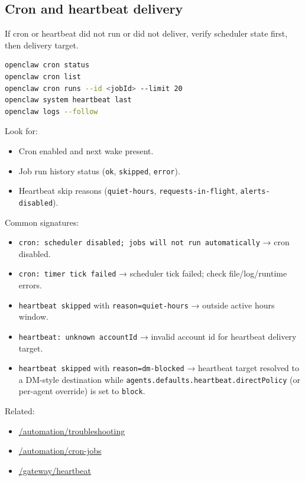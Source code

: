 \subsection{Cron and heartbeat delivery}


If cron or heartbeat did not run or did not deliver, verify scheduler state first, then delivery target.

\begin{lstlisting}[language=bash]
openclaw cron status
openclaw cron list
openclaw cron runs --id <jobId> --limit 20
openclaw system heartbeat last
openclaw logs --follow
\end{lstlisting}


Look for:

\begin{itemize}
  \item Cron enabled and next wake present.
  \item Job run history status (\texttt{ok}, \texttt{skipped}, \texttt{error}).
  \item Heartbeat skip reasons (\texttt{quiet-hours}, \texttt{requests-in-flight}, \texttt{alerts-disabled}).
\end{itemize}


Common signatures:

\begin{itemize}
  \item \texttt{cron: scheduler disabled; jobs will not run automatically} → cron disabled.
  \item \texttt{cron: timer tick failed} → scheduler tick failed; check file/log/runtime errors.
  \item \texttt{heartbeat skipped} with \texttt{reason=quiet-hours} → outside active hours window.
  \item \texttt{heartbeat: unknown accountId} → invalid account id for heartbeat delivery target.
  \item \texttt{heartbeat skipped} with \texttt{reason=dm-blocked} → heartbeat target resolved to a DM-style destination while \texttt{agents.defaults.heartbeat.directPolicy} (or per-agent override) is set to \texttt{block}.
\end{itemize}


Related:

\begin{itemize}
  \item \href{/automation/troubleshooting}{/automation/troubleshooting}
  \item \href{/automation/cron-jobs}{/automation/cron-jobs}
  \item \href{/gateway/heartbeat}{/gateway/heartbeat}
\end{itemize}


